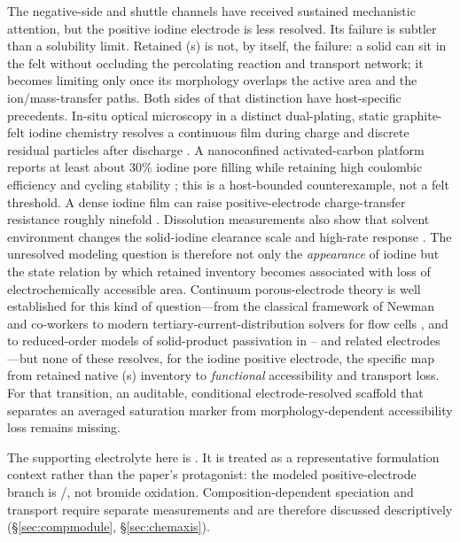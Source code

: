 \documentclass[11pt]{article}
\begin{document}
The negative-side and shuttle channels have received sustained mechanistic attention, but the positive iodine
electrode is less resolved. Its failure is subtler than a solubility limit. Retained (s) is not,
by itself, the failure: a solid can sit in the felt without occluding the percolating reaction and transport
network; it becomes limiting only once its morphology overlaps the active area and the ion/mass-transfer
paths. Both sides of that distinction have host-specific precedents. In-situ optical microscopy in a
distinct dual-plating, static graphite-felt iodine chemistry resolves a continuous  film during charge
and discrete residual particles after discharge \citep{LiDualPlate2025}. A nanoconfined activated-carbon
platform reports at least about $30\%$ iodine pore filling while retaining high coulombic efficiency and
cycling stability \citep{SolidI2_NatCommun2020}; this is a host-bounded counterexample, not a felt threshold.
A dense iodine film can raise positive-electrode charge-transfer resistance
roughly ninefold \citep{Jang2021}. Dissolution measurements also show that solvent environment changes the
solid-iodine clearance scale and high-rate response \citep{Zhao2022}. The unresolved modeling question is
therefore not only the \emph{appearance} of iodine but the state relation by which retained inventory becomes
associated with loss of electrochemically accessible area. Continuum porous-electrode theory is well established for this kind of
question---from the classical framework of Newman and co-workers \citep{Newman1962} to modern
tertiary-current-distribution solvers for flow cells \citep{Tichter2020,Chakrabarti2020,AparicioMauricio2023},
and to reduced-order models of solid-product passivation in -- and related electrodes
\citep{LiS_ROM_JES2025}---but none of these resolves, for the iodine positive electrode, the specific map from
retained native (s) inventory to \emph{functional} accessibility and transport loss. For that
transition, an auditable, conditional electrode-resolved scaffold that separates an averaged saturation
marker from morphology-dependent accessibility loss remains missing.

The supporting electrolyte here is . It is treated as a representative formulation context rather
than the paper's protagonist: the modeled positive-electrode branch is /, not bromide oxidation.
Composition-dependent speciation and transport require separate measurements and are therefore discussed
descriptively (\S\ref{sec:compmodule}, \S\ref{sec:chemaxis}).
\end{document}

